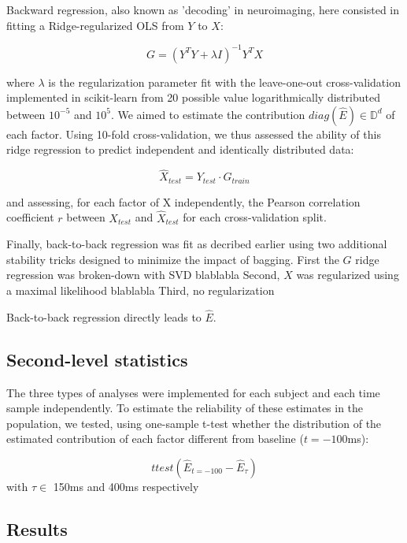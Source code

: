 Backward regression, also known as 'decoding' in neuroimaging, here consisted in
fitting a Ridge-regularized OLS from $Y$ to $X$:

\begin{equation} G = (Y^{T}Y+\lambda I)^{-1} Y^{T}X \end{equation}

where $\lambda$ is the regularization parameter fit with the leave-one-out
cross-validation implemented in scikit-learn \cite{sklearn} from 20 possible
value logarithmically distributed between $10^{-5}$ and $10^5$. We aimed to
estimate the contribution $diag(\hat E) \in\mathbb{D}^{d} $ of each factor.
Using 10-fold cross-validation, we thus assessed the ability of this ridge
regression to predict independent and identically distributed data:

\begin{equation} \hat X_{test} = Y_{test}\cdot G_{train} \end{equation}

and assessing, for each factor of X independently, the Pearson correlation
coefficient $r$ between $X_{test}$ and $\hat X_{test}$ for each cross-validation
split.

Finally, back-to-back regression was fit as decribed earlier using two
additional stability tricks designed to minimize the impact of bagging.  First
the $G$ ridge regression was broken-down with SVD blablabla Second, $X$ was
regularized using a maximal likelihood blablabla Third, no regularization

Back-to-back regression directly leads to $\hat E$.


\subsection{Second-level statistics}

The three types of analyses were implemented for each subject and each time
sample independently.  To estimate the reliability of these estimates in the
population, we tested, using one-sample t-test whether the distribution of the
estimated contribution of each factor different from baseline ($t=-100$ms):

\begin{equation} ttest(\hat E_{t=-100} - \hat E_{\tau}) \end{equation} with
$\tau \in $ 150ms and 400ms respectively


\subsection{Results}

